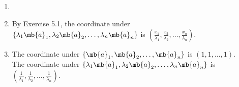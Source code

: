 \begin{exercise}
\begin{enumerate}
			\begin{solution}
				\begin{enumerate}
					\item []
					\item By Exercise 5.1, the coordinate under $\{\lambda_1 \mb{a}_1, \lambda_2 \mb{a}_2, \dots, \lambda_n\mb{a}_n\}$ is $(\frac{x_1}{\lambda_1}, \frac{x_2}{\lambda_2}, \dots, \frac{x_n}{\lambda_n})$.
					\item The coordinate under $\{\mb{a}_1, \mb{a}_2, \dots, \mb{a}_n\}$ is $(1,1,\dots,1)$. \\
						The coordinate under $\{\lambda_1 \mb{a}_1, \lambda_2 \mb{a}_2, \dots, \lambda_n\mb{a}_n\}$ is $(\frac{1}{\lambda_1}, \frac{1}{\lambda_2}, \dots, \frac{1}{\lambda_n})$.
						\qedhere
				\end{enumerate}
			\end{solution}

	\end{enumerate}
\end{exercise}


